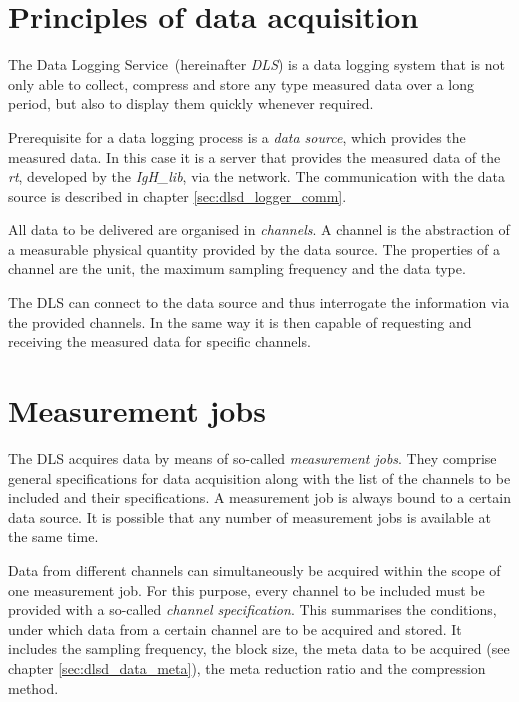 \documentclass[a4paper,12pt,BCOR6mm,bibtotoc,idxtotoc]{scrbook}
\begin{document}
\section{Principles of data acquisition} \label{sec:allg_grund}

The \glqq Data Logging Service\grqq\ (hereinafter \textit{DLS}) is a data logging system that is not only able to collect, compress and store any type measured data over a long period, but also to display them quickly whenever required.

Prerequisite for a data logging process is a \textit{data source}, which provides the measured data. In this case it is a server that provides the measured data of the \textit{rt}, developed by the \textit{IgH\_lib}, via the network. The communication with the data source is described in chapter \ref{sec:dlsd_logger_comm}.

All data to be delivered are organised in \textit{channels}. A channel is the abstraction of a measurable physical quantity provided by the data source. The properties of a channel are the unit, the maximum sampling frequency and the data type.

The DLS can connect to the data source and thus interrogate the information via the provided channels. In the same way it is then capable of requesting and receiving the measured data for specific channels.


\section{Measurement jobs} \label{sec:allg_jobs}

The DLS acquires data by means of so-called \textit{measurement jobs}. They comprise general specifications for data acquisition along with the list of the channels to be included and their specifications. A measurement job is always bound to a certain data source. It is possible that any number of measurement jobs is available at the same time.

Data from different channels can simultaneously be acquired within the scope of one measurement job. For this purpose, every channel to be included must be provided with a so-called \textit{channel specification}. This summarises the conditions, under which data from a certain channel are to be acquired and stored. It includes the sampling frequency, the block size, the meta data to be acquired (see chapter \ref{sec:dlsd_data_meta}), the meta reduction ratio and the compression method.
\end{document}
